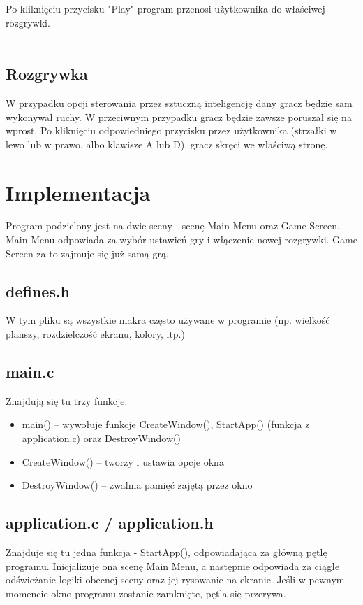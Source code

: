 \documentclass[11pt]{article}
\begin{document}
		\noindent Po kliknięciu przycisku "Play" program przenosi użytkownika do właściwej rozgrywki.
		\\
		\\
		
		\subsection{Rozgrywka}
		W przypadku opcji sterowania przez sztuczną inteligencję dany gracz będzie sam wykonywał ruchy. W przeciwnym przypadku gracz będzie zawsze poruszał się na wprost. Po kliknięciu odpowiedniego przycisku przez użytkownika (strzałki w lewo lub w prawo, albo klawisze A lub D), gracz skręci we właściwą stronę. 

	\section{Implementacja}

		Program podzielony jest na dwie sceny - scenę Main Menu oraz Game Screen. Main Menu odpowiada za wybór ustawień gry i włączenie nowej rozgrywki. Game Screen za to zajmuje się już samą grą.

		\subsection{defines.h}
		\noindent W tym pliku są wszystkie makra często używane w programie (np. wielkość planszy, rozdzielczość ekranu, kolory, itp.)

		\subsection{main.c}
		\noindent Znajdują się tu trzy funkcje:

		\begin{itemize}
			\item main() -- wywołuje funkcje CreateWindow(), StartApp() (funkcja z application.c) oraz DestroyWindow()
			\item CreateWindow() -- tworzy i ustawia opcje okna
			\item DestroyWindow() -- zwalnia pamięć zajętą przez okno
		\end{itemize}

		\subsection{application.c / application.h}
		\noindent Znajduje się tu jedna funkcja - StartApp(), odpowiadająca za główną pętlę programu. Inicjalizuje ona scenę Main Menu, a następnie odpowiada za ciągłe odświeżanie logiki obecnej sceny oraz jej rysowanie na ekranie. Jeśli w pewnym momencie okno programu zostanie zamknięte, pętla się przerywa.
\end{document}
